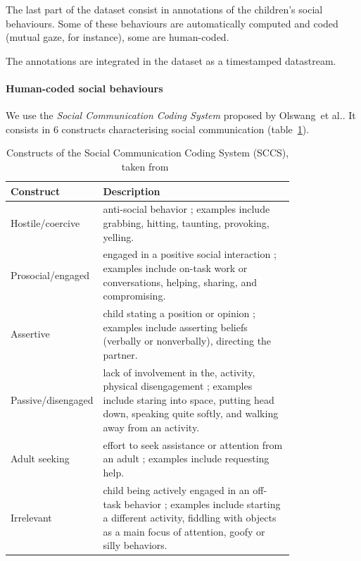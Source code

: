 \documentclass{article}
\newcommand{\etal}{et al.\xspace}
\begin{document}
The last part of the dataset consist in annotations of the
children's social behaviours. Some of these behaviours are automatically
computed and coded (mutual gaze, for instance), some are human-coded.

The annotations are integrated in the dataset as a timestamped datastream.

\paragraph{Human-coded social behaviours}

We use the \emph{Social Communication Coding System} proposed by
Olswang~\etal\cite{olswang2006reliability}. It consists in 6 constructs
characterising social communication (table~\ref{table|sccs}).

\begin{table}[]
\centering
\caption{Constructs of the Social Communication Coding System (SCCS), taken from~\cite{olswang2006reliability}}
\label{table|sccs}
\renewcommand{\arraystretch}{1.8}
\begin{tabular}{@{}lp{0.8\linewidth}@{}}
\toprule
\bf Construct          & \bf Description                                                                                                                                                                                                                                                                                                                                           \\ \midrule
Hostile/coercive   & anti-social behavior ; examples include grabbing, hitting, taunting, provoking, yelling.                                                       \\
Prosocial/engaged  & engaged in a positive social interaction ; examples include on-task work or conversations, helping, sharing, and compromising.                 \\
Assertive          & child stating a position or opinion ; examples include asserting beliefs (verbally or nonverbally), directing the partner.                     \\
Passive/disengaged & lack of involvement in the, activity, physical disengagement ; examples include staring into space, putting head down, speaking quite softly, and walking away from an activity.\\
Adult seeking      & effort to seek assistance or attention from an adult ; examples include requesting help.                                                       \\
Irrelevant         & child being actively engaged in an off-task behavior ; examples include starting a different activity, fiddling with objects as a main focus of attention, goofy or silly behaviors. \\ \bottomrule
\end{tabular}
\end{table}
\end{document}
